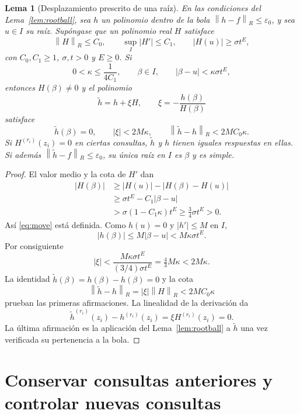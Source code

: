\documentclass[11pt,a4paper]{article}
\numberwithin{equation}{section}
\newtheorem{lemma}[theorem]{Lema}
\theoremstyle{definition}
\theoremstyle{remark}
\newcommand{\norm}[1]{\left\lVert#1\right\rVert}
\begin{document}
\begin{lemma}[Desplazamiento prescrito de una raíz]\label{lem:move}
En las condiciones del Lema~\ref{lem:rootball}, sea $h$ un polinomio dentro de la bola $\norm{h-f}_R\le\varepsilon_0$, y sea $u\in I$ su raíz. Supóngase que un polinomio real $H$ satisface
\[
\norm H_R\le C_0,\qquad \sup_I|H'|\le C_1,\qquad
|H(u)|\ge\sigma t^E,
\]
con $C_0,C_1\ge1$, $\sigma,t>0$ y $E\ge0$. Si
\[
0<\kappa\le\frac1{4C_1},\qquad
\beta\in I,\qquad |\beta-u|<\kappa\sigma t^E,
\]
entonces $H(\beta)\ne0$ y el polinomio
\begin{equation}\label{eq:move}
\widetilde h=h+\xi H,\qquad \xi=-\frac{h(\beta)}{H(\beta)}
\end{equation}
satisface
\[
\widetilde h(\beta)=0,\qquad
|\xi|<2M\kappa,\qquad
\norm{\widetilde h-h}_R<2MC_0\kappa.
\]
Si $H^{(r_i)}(z_i)=0$ en ciertas consultas, $\widetilde h$ y $h$ tienen iguales respuestas en ellas. Si además $\norm{\widetilde h-f}_R\le\varepsilon_0$, su única raíz en $I$ es $\beta$ y es simple.
\end{lemma}
\begin{proof}
El valor medio y la cota de $H'$ dan
\begin{align*}
|H(\beta)|&\ge |H(u)|-|H(\beta)-H(u)|\\
&\ge\sigma t^E-C_1|\beta-u|\\
&>\sigma(1-C_1\kappa)t^E\ge\tfrac34\sigma t^E>0.
\end{align*}
Así \eqref{eq:move} está definida. Como $h(u)=0$ y $|h'|\le M$ en $I$,
\[
|h(\beta)|\le M|\beta-u|<M\kappa\sigma t^E.
\]
Por consiguiente
\[
|\xi|<\frac{M\kappa\sigma t^E}{(3/4)\sigma t^E}
=\tfrac43M\kappa<2M\kappa.
\]
La identidad $\widetilde h(\beta)=h(\beta)-h(\beta)=0$ y la cota
\[
\norm{\widetilde h-h}_R=|\xi|\norm H_R<2MC_0\kappa
\]
prueban las primeras afirmaciones. La linealidad de la derivación da
\[
\widetilde h^{(r_i)}(z_i)-h^{(r_i)}(z_i)=\xi H^{(r_i)}(z_i)=0.
\]
La última afirmación es la aplicación del Lema~\ref{lem:rootball} a $\widetilde h$ una vez verificada su pertenencia a la bola.
\end{proof}

\par
\bigskip

\section{Conservar consultas anteriores y controlar nuevas consultas}\label{sec:linear}
\end{document}
